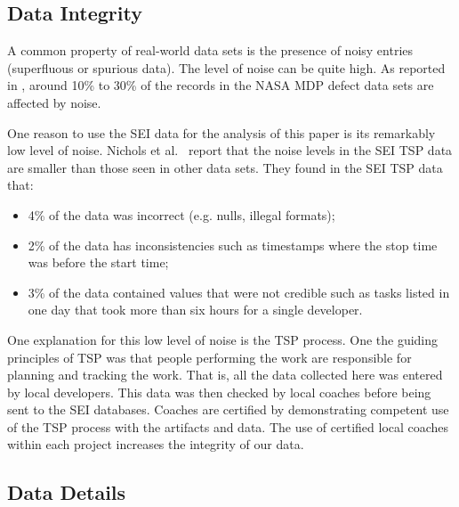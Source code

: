 \documentclass[smallcondesed]{svjour3}
\newcommand{\bi}{\begin{itemize}}%
\newcommand{\ei}{\end{itemize}}
\begin{document}
 
\subsection{Data Integrity}

A common property of real-world data sets is the presence
of noisy entries (superfluous  or spurious data). 
The level of noise can be quite high. As reported
in \cite{shepperd12}, around
10\% to 30\%
of the records in the NASA MDP defect data sets are
affected by noise. 

One reason to use the SEI data for the analysis of this paper is its remarkably low level of noise.
Nichols et al.~\cite{shirai14}  report that
the noise levels in the SEI TSP data are smaller than those seen
in other data sets. They found in the SEI TSP data that:\bi 
\item
4\% of the data was incorrect (e.g. nulls, illegal formats);
\item  2\% of the data has inconsistencies such as timestamps
where the stop time was before the start time;
\item 3\% of the data contained values that were not credible
such as tasks listed in one day that took more than six hours for a single developer.
\ei 
One explanation for this low level of noise is the TSP process.
One the guiding principles of TSP was that  people performing the work are  responsible for planning and tracking the work. That is,  all the data collected here was entered
by local developers. This data was then checked by local coaches before being sent to the SEI
databases. Coaches are certified by demonstrating competent use of the TSP process with the artifacts and data.
The use of certified local coaches within each project increases the integrity of our data.


\subsection{Data Details}
\label{sec:data-collection}

\end{document}
